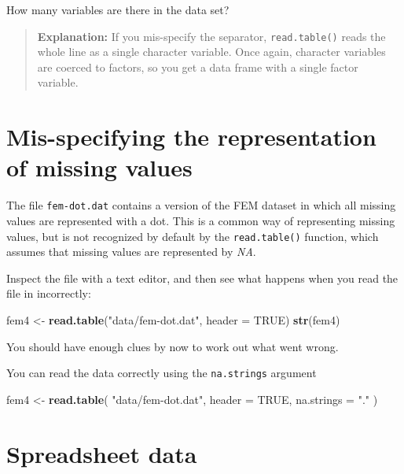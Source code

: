 \documentclass[
]{book}
\newenvironment{Shaded}{\begin{snugshade}}{\end{snugshade}}
\newcommand{\AttributeTok}[1]{\textcolor[rgb]{0.13,0.29,0.53}{#1}}
\newcommand{\ConstantTok}[1]{\textcolor[rgb]{0.56,0.35,0.01}{#1}}
\newcommand{\FunctionTok}[1]{\textcolor[rgb]{0.13,0.29,0.53}{\textbf{#1}}}
\newcommand{\NormalTok}[1]{#1}
\newcommand{\OtherTok}[1]{\textcolor[rgb]{0.56,0.35,0.01}{#1}}
\newcommand{\StringTok}[1]{\textcolor[rgb]{0.31,0.60,0.02}{#1}}
\begin{document}
How many variables are there in the data set?

\begin{quote}
\textbf{Explanation:} If you mis-specify the separator,
\texttt{read.table()} reads the whole line as a single character
variable. Once again, character variables are coerced to factors, so
you get a data frame with a single factor variable.
\end{quote}

\section{Mis-specifying the representation of missing values}\label{mis-specifying-the-representation-of-missing-values}

The file \texttt{fem-dot.dat} contains a version of the FEM dataset in
which all missing values are represented with a dot. This is a common
way of representing missing values, but is not recognized by default
by the \texttt{read.table()} function, which assumes that missing values
are represented by \emph{NA}.

Inspect the file with a text editor, and then see what happens when
you read the file in incorrectly:

\begin{Shaded}
\begin{Highlighting}[]
\NormalTok{fem4 }\OtherTok{\textless{}{-}} \FunctionTok{read.table}\NormalTok{(}\StringTok{"data/fem{-}dot.dat"}\NormalTok{, }\AttributeTok{header =} \ConstantTok{TRUE}\NormalTok{)}
\FunctionTok{str}\NormalTok{(fem4)}
\end{Highlighting}
\end{Shaded}

You should have enough clues by now to work out what went wrong.

You can read the data correctly using the \texttt{na.strings} argument

\begin{Shaded}
\begin{Highlighting}[]
\NormalTok{fem4 }\OtherTok{\textless{}{-}} 
  \FunctionTok{read.table}\NormalTok{(}
    \StringTok{"data/fem{-}dot.dat"}\NormalTok{, }
    \AttributeTok{header =} \ConstantTok{TRUE}\NormalTok{, }
    \AttributeTok{na.strings =} \StringTok{"."}
\NormalTok{  )}
\end{Highlighting}
\end{Shaded}

\section{Spreadsheet data}\label{spreadsheet-data}
\end{document}
